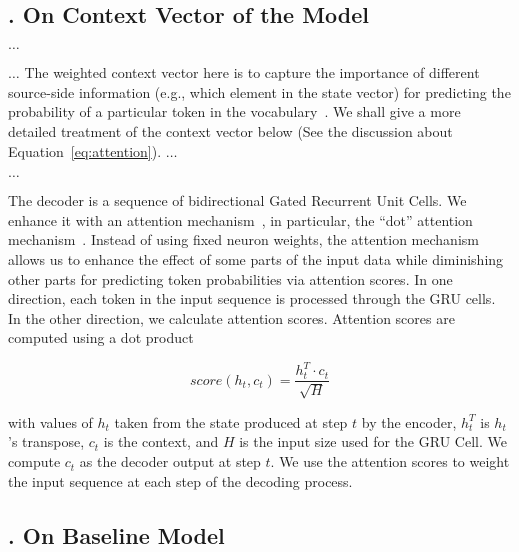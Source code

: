 \subsection{. On Context Vector of the Model}

\begin{revisiontext}
	$\ldots$

	$\ldots$
The weighted context vector here is to capture
the importance of different source-side information (e.g., which element in the state
vector) for predicting the probability of a particular token in the vocabulary~\cite{luong2015effective}.
We shall give a more detailed treatment of the context vector below (See the discussion about  Equation~\eqref{eq:attention}).
	$\ldots$

	$\ldots$

	The decoder is a sequence of bidirectional Gated Recurrent Unit Cells. We enhance
	it with an attention mechanism~\cite{niu2021review}, in particular, the ``dot'' 
	attention mechanism~\cite{luong2015effective}. 
	Instead of using fixed
	neuron weights, the attention mechanism allows us to enhance the 
	effect of some parts of the input data while diminishing other parts for predicting
	token probabilities via attention scores. 
	In one
	direction, each token in the input sequence is processed through the GRU cells.
	In the other direction, we calculate attention scores. Attention scores are
	computed using a dot product~\cite{raff_inside_2021}
	
	\begin{equation} \label{eq:attention}
	score(h_t, c_t) = \frac{h_t^T \cdot c_t}{\sqrt{H}}
	\end{equation}
	
	\noindent with values of $h_t$ taken from the state produced at step $t$ by the
	encoder, $h_t^T$ is $h_t$'s transpose, $c_t$ is the context, 
	and $H$ is the
	input size used for the GRU Cell. We compute $c_t$ as the decoder output at step $t$.
	We use the attention scores to weight the input sequence at each step of the decoding process.
	
\end{revisiontext}	

\subsection{. On Baseline Model}

